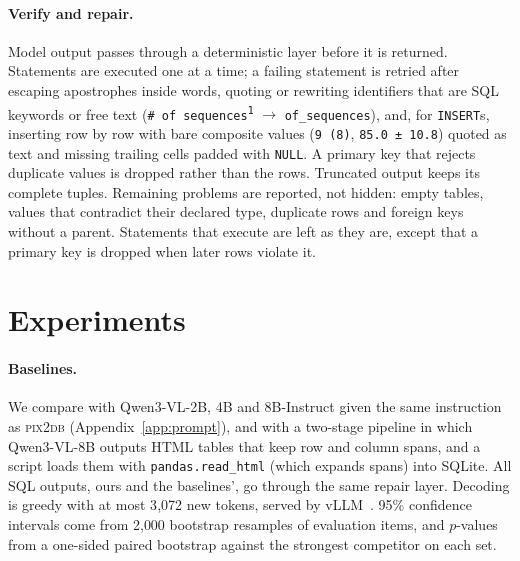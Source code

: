 \documentclass[10pt,twocolumn]{article}
\newcommand{\sys}{\textsc{pix2db}}
\begin{document}
\paragraph{Verify and repair.} Model output passes through a deterministic layer before it is returned. Statements
are executed one at a time; a failing statement is retried after escaping apostrophes inside words, quoting or
rewriting identifiers that are SQL keywords or free text (\texttt{\# of sequences\textsuperscript{1}}
$\rightarrow$ \texttt{of\_sequences}), and, for \texttt{INSERT}s, inserting row by row with bare composite values
(\texttt{9 (8)}, \texttt{85.0 ± 10.8}) quoted as text and missing trailing cells padded with \texttt{NULL}. A primary
key that rejects duplicate values is dropped rather than the rows. Truncated output keeps its complete tuples.
Remaining problems are reported, not hidden: empty tables, values that contradict their declared type, duplicate
rows and foreign keys without a parent. Statements that execute are left as they are, except that a primary key
is dropped when later rows violate it.

\section{Experiments}
\label{sec:results}

\paragraph{Baselines.} We compare with Qwen3-VL-2B, 4B and 8B-Instruct given the same instruction as \sys{}
(Appendix~\ref{app:prompt}), and with a two-stage pipeline in which Qwen3-VL-8B outputs HTML tables that keep
row and column spans, and a script loads them with \texttt{pandas.read\_html} (which expands spans) into SQLite.
All SQL outputs, ours and the baselines', go through the same repair layer. Decoding is greedy with at most 3{,}072
new tokens, served by vLLM~\citep{kwon2023vllm}. 95\% confidence intervals come from 2{,}000 bootstrap resamples of
evaluation items, and $p$-values from a one-sided paired bootstrap against the strongest competitor on each set.

\begin{table}[t]
\centering\small
\setlength{\tabcolsep}{4.5pt}

\caption{Main results with 95\% bootstrap intervals. Synthetic: table exact match on 900 images from unseen
databases; PubTabNet, FinTabNet, TabRecSet: cell F1; CORD and synthetic receipts: cell recall; FK recall on the
synthetic test images that contain a foreign key. Against the best competitor on each set, \sys{} is ahead with
$p<0.001$ on synthetic, FinTabNet, CORD and synthetic receipts and with $p=\Nprealpubtabnet$ on PubTabNet; on
TabRecSet the 8B HTML pipeline is ahead by 0.06 (paired 95\% interval of the difference $[0.03, 0.09]$, $p<0.001$;
Wilcoxon signed-rank $p<0.001$), although the marginal intervals overlap.}
\label{tab:main}
\end{table}
\end{document}

